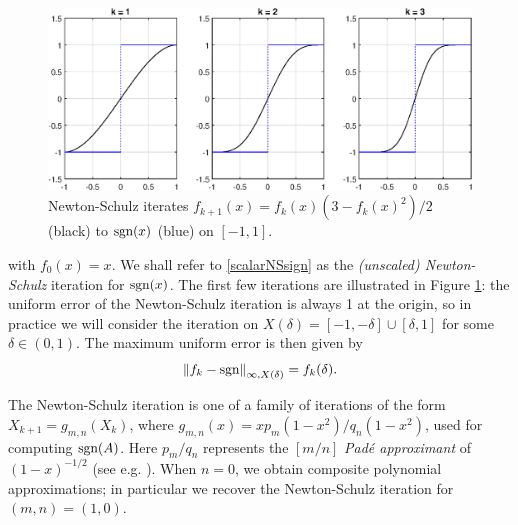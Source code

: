 \begin{figure}[t!]
    \centering
    \includegraphics[width=\textwidth,height=\textheight,keepaspectratio]{figures/chapter_2/Sign_undershoot.eps}
    \caption{Newton-Schulz iterates $f_{k+1}(x)=f_k(x)(3-f_k(x)^2)/2$ (black) to $\text{sgn}(x)$ (blue) on $[-1,1]$.}
    \label{fig:NSsigny}
\end{figure}

with $f_0(x)=x$. We shall refer to \eqref{scalarNSsign} as the \textit{(unscaled) Newton-Schulz} iteration for $\text{sgn}(x)$. The first few iterations are illustrated in Figure \ref{fig:NSsigny}: the uniform error of the Newton-Schulz iteration is always 1 at the origin, so in practice we will consider the iteration on $X(\delta)=[-1,-\delta]\cup[\delta,1]$ for some $\delta \in(0,1)$. The maximum uniform error is then given by
\[\left\lVert f_k-\text{sgn}\right\rVert_{\infty,X(\delta)}=f_k(\delta).\]
\begin{rmk}
The Newton-Schulz iteration is one of a family of iterations of the form $X_{k+1}=g_{m,n}(X_k)$, where $g_{m,n}(x)=x p_m(1-x^2)/q_n(1-x^2)$, used for computing $\text{sgn}(A)$. Here $p_m/q_n$ represents the $[m/n]$ \textit{Padé approximant} of $(1-x)^{-1/2}$ (see e.g. \cite[Section 3]{kenneylaubrational}). When $n=0$, we obtain composite polynomial approximations; in particular we recover the Newton-Schulz iteration for $(m,n)=(1,0)$. 
\end{rmk} 



